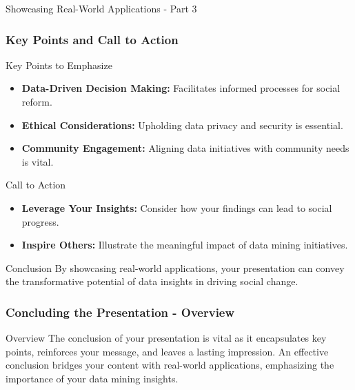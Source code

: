 \documentclass[aspectratio=169]{beamer}
\begin{document}
\begin{frame}[fragile]{Showcasing Real-World Applications - Part 3}
    \frametitle{Key Points and Call to Action}
    
    \begin{block}{Key Points to Emphasize}
        \begin{itemize}
            \item \textbf{Data-Driven Decision Making:} Facilitates informed processes for social reform.
            \item \textbf{Ethical Considerations:} Upholding data privacy and security is essential.
            \item \textbf{Community Engagement:} Aligning data initiatives with community needs is vital.
        \end{itemize}
    \end{block}

    \begin{block}{Call to Action}
        \begin{itemize}
            \item \textbf{Leverage Your Insights:} Consider how your findings can lead to social progress.
            \item \textbf{Inspire Others:} Illustrate the meaningful impact of data mining initiatives.
        \end{itemize}
    \end{block}

    \begin{block}{Conclusion}
        By showcasing real-world applications, your presentation can convey the transformative potential of data insights in driving social change.
    \end{block}
\end{frame}

\begin{frame}[fragile]
    \frametitle{Concluding the Presentation - Overview}
    \begin{block}{Overview}
        The conclusion of your presentation is vital as it encapsulates key points, reinforces your message, and leaves a lasting impression. An effective conclusion bridges your content with real-world applications, emphasizing the importance of your data mining insights.
    \end{block}
\end{frame}
\end{document}
